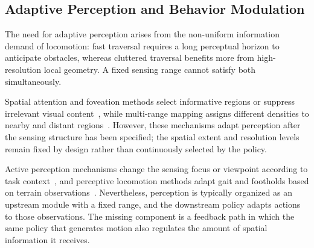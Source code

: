 \documentclass[letterpaper, 10 pt, conference]{ieeeconf/ieeeconf}
\begin{document}
\subsection{Adaptive Perception and Behavior Modulation}
The need for adaptive perception arises from the non-uniform information demand of locomotion: fast traversal requires a long perceptual horizon to anticipate obstacles, whereas cluttered traversal benefits more from high-resolution local geometry. A fixed sensing range cannot satisfy both simultaneously.


Spatial attention and foveation methods select informative regions or suppress irrelevant visual content~\cite{Wang_2025_AdaptiveVision,Zhang_2026_FocusNav}, while multi-range mapping assigns different densities to nearby and distant regions~\cite{Patel_2024_RoadRunnerMM}. However, these mechanisms adapt perception after the sensing structure has been specified; the spatial extent and resolution levels remain fixed by design rather than continuously selected by the policy.

Active perception mechanisms change the sensing focus or viewpoint according to task context~\cite{Liu_2026_ActiveVLA}, and perceptive locomotion methods adapt gait and footholds based on terrain observations~\cite{zhuang2024humanoid,long2025learning,wang2025beamdojo,ren2025vb}. Nevertheless, perception is typically organized as an upstream module with a fixed range, and the downstream policy adapts actions to those observations. The missing component is a feedback path in which the same policy that generates motion also regulates the amount of spatial information it receives.
\end{document}
